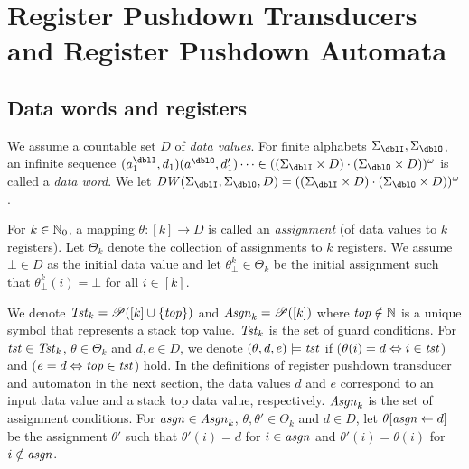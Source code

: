 \section{Register Pushdown Transducers and Register Pushdown Automata}
\subsection{Data words and registers}
We assume a countable set $D$ of \emph{data values}.
For finite alphabets $\Sigma_\dblI,\Sigma_\dblO$,
an infinite sequence $(a^\dblI_1,d_1)(a^\dblO,d'_1)\cdots \in ((\Sigma_\dblI\times D)\cdot(\Sigma_\dblO\times D))^\omega$ is called a \emph{data word}.
We let $\DW(\Sigma_\dblI,\Sigma_\dblO,D)=((\Sigma_\dblI\times D)\cdot(\Sigma_\dblO\times D))^\omega$.

For $k\in\mathbb{N}_0$, a mapping $\theta: [k] \to D$ is called an \emph{assignment}
(of data values to $k$ registers).
Let $\Theta_k$ denote the collection of assignments to $k$ registers.
We assume $\bot\in D$ as the initial data value and
let $\theta^k_\bot\in\Theta_k$ be the initial assignment such that
$\theta^k_\bot(i)=\bot$ for all $i\in[k]$.

We denote $\mathit{Tst}_k = \mathscr{P}([k]\cup\{\mathit{top}\})$ and $\mathit{Asgn}_k = \mathscr{P}([k])$
where $\mathit{top}\notin\mathbb{N}$ is a unique symbol that represents a stack top value.
$\mathit{Tst}_k$ is the set of guard conditions.
For $\mathit{tst}\in\mathit{Tst}_k$, $\theta\in\Theta_k$ and $d,e\in D$,
we denote $(\theta,d,e)\models\mathit{tst}$
if ($\theta(i) = d \Leftrightarrow i\in\mathit{tst}$)
and ($e = d \Leftrightarrow \mathit{top}\in\mathit{tst}$) hold.
In the definitions of register pushdown transducer and automaton in the next section,
the data values $d$ and $e$ correspond to an input data value and a stack top data value, respectively.
$\mathit{Asgn}_k$ is the set of assignment conditions.
For $\mathit{asgn}\in\mathit{Asgn}_k$, $\theta,\theta'\in\Theta_k$ and $d\in D$,
let $\theta[\mathit{asgn}\leftarrow d]$ be the assignment
$\theta'$ such that $\theta'(i) = d$ for $i\in\mathit{asgn}$ and $\theta'(i)=\theta(i)$ for $i\notin\mathit{asgn}$.

